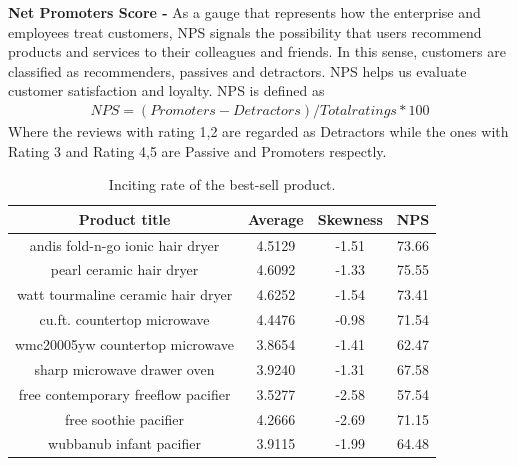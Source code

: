 \documentclass[12pt]{article}%
\begin{document}
\textbf{Net Promoters Score -} 
As a gauge that represents how the enterprise and employees treat customers, NPS signals the possibility that users recommend products and services to their colleagues and friends. In this sense, customers are classified as recommenders, passives and detractors. NPS helps us evaluate customer satisfaction and loyalty\cite{nsp}. NPS is defined as
\begin{gather}
NPS = (Promoters - Detractors)/Total ratings * 100
\end{gather}
Where the reviews with rating 1,2 are regarded as Detractors while the ones with Rating 3 and Rating 4,5 are Passive and Promoters respectly.

\begin{table}[H]
	\centering
	\caption{Inciting rate of the best-sell product.}	
	\begin{tabular}{cccc}
		\toprule[1.5pt]
		\multicolumn{1}{m{7cm}}{\centering Product title} & \multicolumn{1}{m{2cm}}{\centering Average}&
		\multicolumn{1}{m{2cm}}{\centering Skewness} &
		\multicolumn{1}{m{2cm}}{\centering NPS} \\
		\midrule[1pt]
		andis fold-n-go ionic hair dryer &4.5129&-1.51&73.66\\
		pearl ceramic hair dryer     & 4.6092&-1.33&75.55\\
		watt tourmaline ceramic hair dryer          &4.6252&-1.54&73.41\\
		\midrule[1pt]
		cu.ft. countertop microwave          &4.4476&-0.98&71.54\\
		wmc20005yw  countertop microwave          &3.8654&-1.41&62.47\\
		sharp microwave drawer oven        &3.9240&-1.31&67.58\\
		\midrule[1pt]
		free contemporary freeflow pacifier        &3.5277&-2.58&57.54\\
		free soothie pacifier       &4.2666&-2.69&71.15\\
		wubbanub infant pacifier&3.9115&-1.99&64.48\\
		\bottomrule[1.6pt]
	\end{tabular}\label{biasssssssso}
\end{table}
\end{document}
